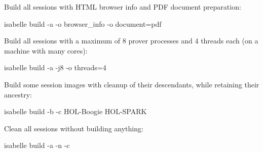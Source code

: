 \begin{isabellebody}
\begin{isamarkuptext}
  \smallskip Build all sessions with HTML browser info and PDF
  document preparation:
\begin{ttbox}
isabelle build -a -o browser_info -o document=pdf
\end{ttbox}

  \smallskip Build all sessions with a maximum of 8 prover processes
  and 4 threads each (on a machine with many cores):
\begin{ttbox}
isabelle build -a -j8 -o threads=4
\end{ttbox}

  \smallskip Build some session images with cleanup of their
  descendants, while retaining their ancestry:
\begin{ttbox}
isabelle build -b -c HOL-Boogie HOL-SPARK
\end{ttbox}

  \smallskip Clean all sessions without building anything:
\begin{ttbox}
isabelle build -a -n -c
\end{ttbox}%
\end{isamarkuptext}%
\isamarkuptrue%
%
\isadelimtheory
%
\endisadelimtheory
%
\isatagtheory
{}\isamarkupfalse%
%
\endisatagtheory
{\isafoldtheory}%
%
\isadelimtheory
%
\endisadelimtheory
\isanewline
\end{isabellebody}%
